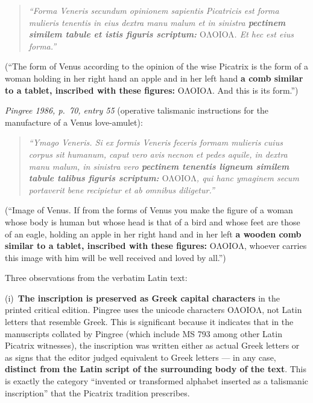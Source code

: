 \begin{quote}
\itshape
``Forma Veneris secundum opinionem sapientis Picatricis est forma mulieris
tenentis in eius dextra manu malum et in sinistra \textbf{pectinem similem
tabule et istis figuris scriptum:} $\mathrm{O\Lambda OIO\Lambda}$.
Et hec est eius forma.''
\end{quote}

\noindent (``The form of Venus according to the opinion of the wise Picatrix is
the form of a woman holding in her right hand an apple and in her left hand
\textbf{a comb similar to a tablet, inscribed with these figures:}
$\mathrm{O\Lambda OIO\Lambda}$. And this is its form.'')

\medskip

\noindent\textit{Pingree 1986, p.~70, entry 55} (operative talismanic
instructions for the manufacture of a Venus love-amulet):

\begin{quote}
\itshape
``Ymago Veneris. Si ex formis Veneris feceris formam mulieris cuius corpus sit
humanum, caput vero avis necnon et pedes aquile, in dextra manu malum, in
sinistra vero \textbf{pectinem tenentis ligneum similem tabule talibus figuris
scriptum:} $\mathrm{O\Lambda OIO\Lambda}$, qui hanc ymaginem secum portaverit
bene recipietur et ab omnibus diligetur.''
\end{quote}

\noindent (``Image of Venus. If from the forms of Venus you make the figure of
a woman whose body is human but whose head is that of a bird and whose feet
are those of an eagle, holding an apple in her right hand and in her left
\textbf{a wooden comb similar to a tablet, inscribed with these figures:}
$\mathrm{O\Lambda OIO\Lambda}$, whoever carries this image with him will be
well received and loved by all.'')

\medskip

\noindent Three observations from the verbatim Latin text:

\noindent (i)~\textbf{The inscription is preserved as Greek capital
characters} in the printed critical edition. Pingree uses the unicode
characters $\mathrm{O\Lambda OIO\Lambda}$, not Latin letters that resemble
Greek. This is significant because it indicates that in the manuscripts
collated by Pingree (which include MS 793 among other Latin Picatrix
witnesses), the inscription was written either as actual Greek letters or as
signs that the editor judged equivalent to Greek letters --- in any case,
\textbf{distinct from the Latin script of the surrounding body of the text}.
This is exactly the category ``invented or transformed alphabet inserted as a
talismanic inscription'' that the Picatrix tradition prescribes.

